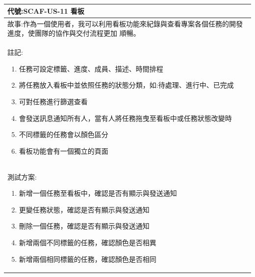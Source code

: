 \documentclass{report}
\begin{document}
\subsection*{}
\fontsize{12}{20}\selectfont
\begin{tabularx}{\textwidth}{|X|}
  \hline
  代號:SCAF-US-11 看板 \\
  \hline
  故事:作為一個使用者，我可以利用看板功能來紀錄與查看專案各個任務的開發進度，使團隊的協作與交付流程更加
  順暢。 \\
  \hline
  註記:
  \begin{enumerate}
    \item 任務可設定標籤、進度、成員、描述、時間排程
    \item 將任務放入看板中並依照任務的狀態分類，如:待處理、進行中、已完成
    \item 可對任務進行篩選查看
    \item 會發送訊息通知所有人，當有人將任務拖曳至看板中或任務狀態改變時
    \item 不同標籤的任務會以顏色區分
    \item 看板功能會有一個獨立的頁面
  \end{enumerate} \\
  \hline
  測試方案:
  \begin{enumerate}
    \item 新增一個任務至看板中，確認是否有顯示與發送通知
    \item 更變任務狀態，確認是否有顯示與發送通知
    \item 刪除一個任務，確認是否有顯示與發送通知
    \item 新增兩個不同標籤的任務，確認顏色是否相異
    \item 新增兩個相同標籤的任務，確認顏色是否相同
  \end{enumerate} \\
  \hline
\end{tabularx}
\end{document}
